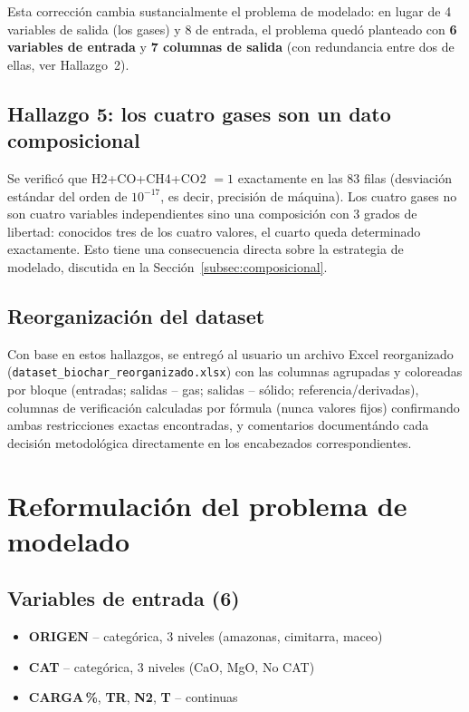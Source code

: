 \documentclass[11pt,a4paper]{article}
\begin{document}
Esta correcci\'on cambia sustancialmente el problema de modelado: en lugar de
4 variables de salida (los gases) y 8 de entrada, el problema qued\'o
planteado con \textbf{6 variables de entrada} y \textbf{7 columnas de
salida} (con redundancia entre dos de ellas, ver Hallazgo~2).

\subsection{Hallazgo 5: los cuatro gases son un dato composicional}

Se verific\'o que H2+CO+CH4+CO2 $=1$ exactamente en las 83 filas (desviaci\'on
est\'andar del orden de $10^{-17}$, es decir, precisi\'on de m\'aquina). Los
cuatro gases no son cuatro variables independientes sino una composici\'on
con 3 grados de libertad: conocidos tres de los cuatro valores, el cuarto
queda determinado exactamente. Esto tiene una consecuencia directa sobre la
estrategia de modelado, discutida en la Secci\'on~\ref{subsec:composicional}.

\subsection{Reorganizaci\'on del dataset}

Con base en estos hallazgos, se entreg\'o al usuario un archivo Excel
reorganizado (\texttt{dataset\_biochar\_reorganizado.xlsx}) con las columnas
agrupadas y coloreadas por bloque (entradas; salidas -- gas; salidas --
s\'olido; referencia/derivadas), columnas de verificaci\'on calculadas por
f\'ormula (nunca valores fijos) confirmando ambas restricciones exactas
encontradas, y comentarios document\'ando cada decisi\'on metodol\'ogica
directamente en los encabezados correspondientes.

\section{Reformulaci\'on del problema de modelado}
\label{sec:reformulacion}

\subsection{Variables de entrada (6)}

\begin{itemize}[nosep]
    \item \textbf{ORIGEN} -- categ\'orica, 3 niveles (amazonas, cimitarra, maceo)
    \item \textbf{CAT} -- categ\'orica, 3 niveles (CaO, MgO, No CAT)
    \item \textbf{CARGA\,\%}, \textbf{TR}, \textbf{N2}, \textbf{T} -- continuas
\end{itemize}
\end{document}
